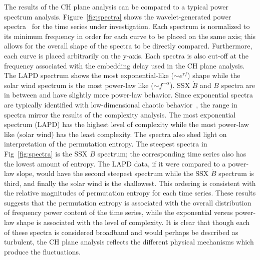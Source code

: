 \documentclass[aps,prx,twocolumn,secnumarabic,nobalancelastpage,amsmath,amssymb,
nofootinbib]{revtex4-1}
\begin{document}
The results of the CH plane analysis can be compared to a typical power spectrum analysis. Figure~\ref{fig:spectra} shows the wavelet-generated power spectra~\cite{torrence1998} for the time series under investigation. Each spectrum is normalized to its minimum frequency in order for each curve to be placed on the same axis; this allows for the overall shape of the spectra to be directly compared. Furthermore, each curve is placed arbitrarily on the y-axis. Each spectra is also cut-off at the frequency associated with the embedding delay used in the CH plane analysis. The LAPD spectrum shows the most exponential-like ($\sim e^{\tau f}$) shape while the solar wind spectrum is the most power-law like ($\sim f^{-\alpha}$). SSX $\dot{B}$ and $B$ spectra are in between and have slightly more power-law behavior. Since exponential spectra are typically identified with low-dimensional chaotic behavior~\cite{maggs2012}, the range in spectra mirror the results of the complexity analysis. The most exponential spectrum (LAPD) has the highest level of complexity while the most power-law like (solar wind) has the least complexity. The spectra also shed light on interpretation of the permutation entropy. The steepest spectra in Fig~\ref{fig:spectra} is the SSX $B$ spectrum; the corresponding time series also has the lowest amount of entropy. The LAPD data, if it were compared to a power-law slope, would have the second steepest spectrum while the SSX $\dot{B}$ spectrum is third, and finally the solar wind is the shallowest. This ordering is consistent with the relative magnitudes of permutation entropy for each time series. These results suggests that the permutation entropy is associated with the overall distribution of frequency power content of the time series, while the exponential versus power-law shape is associated with the level of complexity. It is clear that though each of these spectra is considered broadband and would perhaps be described as turbulent, the CH plane analysis reflects the different physical mechanisms which produce the fluctuations.
\end{document}
